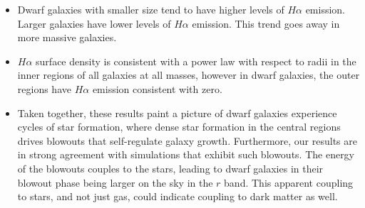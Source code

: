 \documentclass[iop]{emulateapj}
\begin{document}
\begin{itemize}
\item Dwarf galaxies with smaller size tend to have higher levels of $H\alpha$ emission. Larger galaxies have lower levels of $H\alpha$ emission. This trend goes away in more massive galaxies. 

\item $H\alpha$ surface density is consistent with a power law with respect to radii in the inner regions of all galaxies at all masses, however in dwarf galaxies, the outer regions have $H\alpha$ emission consistent with zero.

\item Taken together, these results paint a picture of dwarf galaxies experience cycles of star formation, where dense star formation in the central regions drives blowouts that self-regulate galaxy growth. Furthermore, our results are in strong agreement with simulations that exhibit such blowouts. The energy of the blowouts couples to the stars, leading to dwarf galaxies in their blowout phase being larger on the sky in the $r$ band. This apparent coupling to stars, and not just gas, could indicate coupling to dark matter as well.

\end{itemize}









\end{document}

